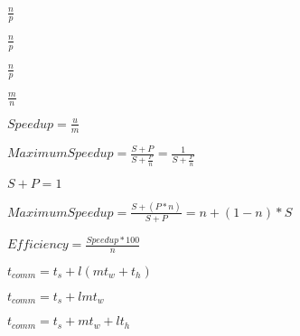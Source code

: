 \documentclass[10pt]{book}
\begin{document}
\begin{mdSnippets}
\begin{mdInlineSnippet}[968be6b12d27790352ef2e42488bd0d9]%
$\frac{n}{p}$\end{mdInlineSnippet}%
\begin{mdInlineSnippet}[968be6b12d27790352ef2e42488bd0d9]%
$\frac{n}{p}$\end{mdInlineSnippet}%
\begin{mdInlineSnippet}[968be6b12d27790352ef2e42488bd0d9]%
$\frac{n}{p}$\end{mdInlineSnippet}%
\begin{mdInlineSnippet}%
$\frac{m}{n}$\end{mdInlineSnippet}%
\begin{mdInlineSnippet}[54d27233387cec200d7a0a80f6f296c5]%
$Speedup = \frac{u}{m}$\end{mdInlineSnippet}%
\begin{mdInlineSnippet}[299e38c7bb4e8309cee5af20f5493a33]%
$Maximum Speedup = \frac{S + P}{S + \frac{P}{n}} = \frac{1}{S + \frac{P}{n}}$\end{mdInlineSnippet}%
\begin{mdInlineSnippet}[44c5dd7ed33800d693c232c130ead225]%
$S + P = 1$\end{mdInlineSnippet}%
\begin{mdInlineSnippet}%
$Maximum Speedup = \frac{S + (P * n)}{S + P} = n + (1 - n) *S$\end{mdInlineSnippet}%
\begin{mdInlineSnippet}%
$Efficiency = \frac{Speedup * 100}{n}$\end{mdInlineSnippet}%
\begin{mdInlineSnippet}[14f13d69ba04cfd2d3520f963e2d0632]%
$t_{comm} = t_s +l(mt_w+t_h)$\end{mdInlineSnippet}%
\begin{mdInlineSnippet}%
$t_{comm} = t_s + lmt_w$\end{mdInlineSnippet}%
\begin{mdInlineSnippet}%
$t_{comm} = t_s + mt_w+ lt_h$\end{mdInlineSnippet}%

\end{mdSnippets}
\end{document}
